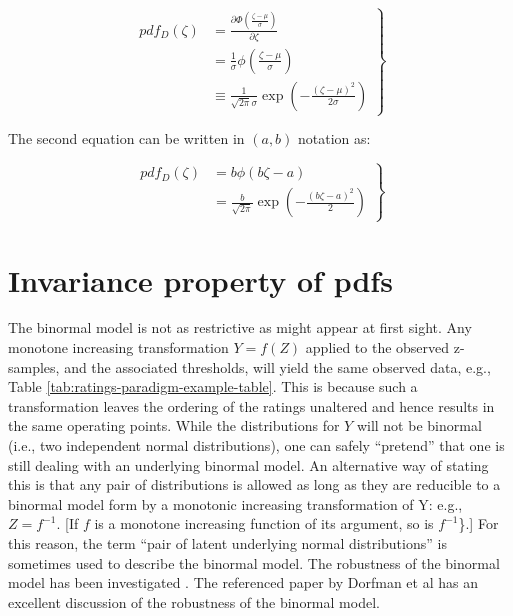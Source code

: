 \documentclass[
]{book}
\begin{document}
\begin{equation} 
\left.
\begin{aligned}
pdf_D\left ( \zeta \right ) &= \frac{\partial \Phi\left ( \frac{\zeta - \mu}{\sigma} \right )}{\partial \zeta} \\ &= \frac{1}{\sigma} \phi\left ( \frac{\zeta - \mu}{\sigma} \right ) \\
&\equiv \frac{1}{\sqrt{2 \pi}\sigma}\exp\left ( -\frac{\left (\zeta-\mu  \right )^2}{2\sigma} \right )
\end{aligned}
\right \}
\label{eq:binormal-model-pdf-d-mu-sigma}
\end{equation}

The second equation can be written in \((a,b)\) notation as:

\begin{equation} 
\left.
\begin{aligned}
pdf_D\left ( \zeta \right ) &= b\phi\left ( b\zeta-a \right ) \\
&= \frac{b}{\sqrt{2 \pi}}\exp\left ( -\frac{\left (b\zeta - a \right )^2}{2} \right )
\end{aligned}
\right \}
\label{eq:binormal-model-pdf-d-a-b}
\end{equation}

\hypertarget{binormal-model-invariance-property}{%
\section{Invariance property of pdfs}\label{binormal-model-invariance-property}}

The binormal model is not as restrictive as might appear at first sight. Any monotone increasing transformation \(Y=f(Z)\) applied to the observed z-samples, and the associated thresholds, will yield the same observed data, e.g., Table \ref{tab:ratings-paradigm-example-table}. This is because such a transformation leaves the ordering of the ratings unaltered and hence results in the same operating points. While the distributions for \(Y\) will not be binormal (i.e., two independent normal distributions), one can safely ``pretend'' that one is still dealing with an underlying binormal model. An alternative way of stating this is that any pair of distributions is allowed as long as they are reducible to a binormal model form by a monotonic increasing transformation of Y: e.g., \(Z=f^{-1}\). {[}If \(f\) is a monotone increasing function of its argument, so is \(f^{-1}\)\}.{]} For this reason, the term ``pair of latent underlying normal distributions'' is sometimes used to describe the binormal model. The robustness of the binormal model has been investigated \citep{hanley1988robustness, dorfman1997proper}. The referenced paper by Dorfman et al has an excellent discussion of the robustness of the binormal model.
\end{document}
